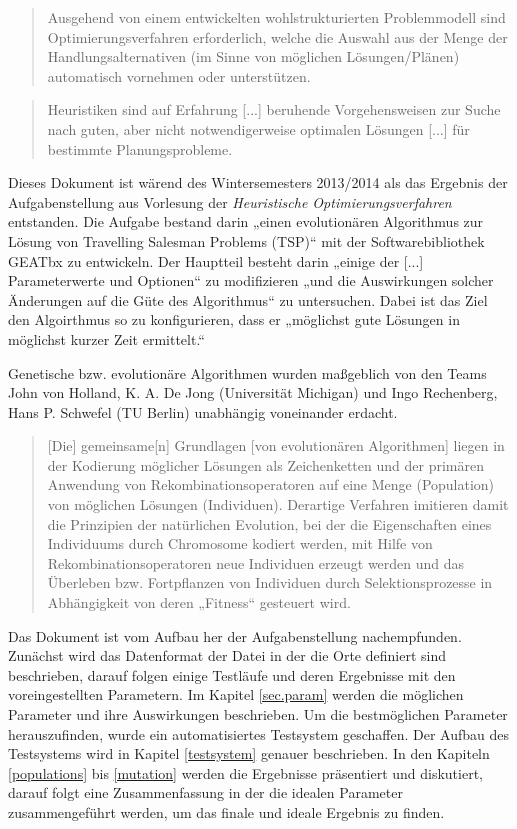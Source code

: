 \begin{quote}
Ausgehend von einem entwickelten wohlstrukturierten Problemmodell sind 
Optimierungsverfahren erforderlich, welche die Auswahl aus der Menge der 
Handlungsalternativen (im Sinne von möglichen Lösungen/Plänen) automatisch
vornehmen oder unterstützen. \citep[S.~3]{fink}
\end{quote}

\begin{quote}
Heuristiken sind auf Erfahrung [...] beruhende Vorgehensweisen zur
Suche nach guten, aber nicht notwendigerweise optimalen Lösungen
[...] für bestimmte Planungsprobleme. \citep[S.~4]{fink}
\end{quote}

\noindent Dieses Dokument ist wärend des Wintersemesters 2013/2014 als das
Ergebnis der Aufgabenstellung aus Vorlesung der
\emph{Heuristische Optimierungsverfahren} entstanden.
Die Aufgabe bestand darin „einen evolutionären Algorithmus zur Lösung von
Travelling Salesman Problems (TSP)“ mit der Softwarebibliothek GEATbx zu entwickeln.
Der Hauptteil besteht darin „einige der [...] Parameterwerte und Optionen“ zu
modifizieren „und die Auswirkungen solcher Änderungen auf die Güte des Algorithmus“
zu untersuchen.
Dabei ist das Ziel den Algoirthmus so zu konfigurieren, dass er
„möglichst gute Lösungen in möglichst kurzer Zeit ermittelt.“ \citep[Aus][]{aufg}

Genetische bzw. evolutionäre Algorithmen wurden maßgeblich von den Teams
John von Holland, K. A. De Jong (Universität Michigan) und
Ingo Rechenberg, Hans P. Schwefel (TU Berlin) unabhängig voneinander erdacht.
\citep[Vgl.][]{erben}

\begin{quote}
[Die] gemeinsame[n] Grundlagen [von evolutionären Algorithmen] liegen in der
Kodierung möglicher Lösungen als Zeichenketten und der primären Anwendung von
Rekombinationsoperatoren auf eine Menge (Population) von möglichen Lösungen
(Individuen). Derartige Verfahren imitieren damit die Prinzipien der
natürlichen Evolution, bei der die Eigenschaften eines Individuums durch
Chromosome kodiert werden, mit Hilfe von Rekombinationsoperatoren neue
Individuen erzeugt werden und das Überleben bzw. Fortpflanzen von Individuen
durch Selektionsprozesse in Abhängigkeit von deren
„Fitness“ gesteuert wird. \citep[S.~6]{fink}
\end{quote}

\noindent Das Dokument ist vom Aufbau her der Aufgabenstellung nachempfunden.
Zunächst wird das Datenformat der Datei in der die Orte definiert sind
beschrieben, darauf folgen einige Testläufe und deren Ergebnisse mit
den voreingestellten Parametern.
Im Kapitel \ref{sec.param} werden die möglichen Parameter und ihre
Auswirkungen beschrieben.
Um die bestmöglichen Parameter herauszufinden, wurde ein automatisiertes
Testsystem geschaffen. Der Aufbau des Testsystems wird in Kapitel
\ref{testsystem} genauer beschrieben.
In den Kapiteln \ref{populations} bis \ref{mutation} werden die Ergebnisse
präsentiert und diskutiert, darauf folgt eine Zusammenfassung in der
die idealen Parameter zusammengeführt werden, um das finale und
ideale Ergebnis zu finden.

